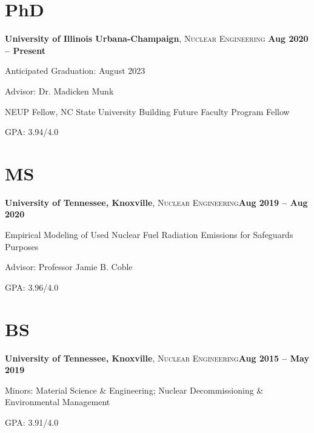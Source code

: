 \documentclass[margin,line]{resume}
\begin{document}
\begin{resume}
    \section{\mysidestyle PhD}
    \textbf{University of Illinois Urbana-Champaign}, \textsc{Nuclear Engineering}\hfill \textbf{ Aug 2020 -- Present}\vspace{-3mm}\\\vspace{-1mm}%
    \begin{list2}
        \item Anticipated Graduation: August 2023
        \item Advisor: Dr. Madicken Munk
        \item NEUP Fellow, NC State University Building Future Faculty Program Fellow
        \item GPA: 3.94/4.0
    \end{list2}
    \section{\mysidestyle MS}
    \textbf{University of Tennessee, Knoxville}, \textsc{Nuclear Engineering}\hfill\textbf{Aug 2019 -- Aug 2020}\vspace{-3mm}\\\vspace{-1mm}%
    \begin{list2}
        \item Empirical Modeling of Used Nuclear Fuel Radiation Emissions for Safeguards Purposes
        \item Advisor: Professor Jamie B. Coble
        \item GPA: 3.96/4.0
    \end{list2}
    \section{\mysidestyle BS}
    \textbf{University of Tennessee, Knoxville}, \textsc{Nuclear Engineering}\hfill\textbf{Aug 2015 -- May 2019}\vspace{-3mm}\\\vspace{-1mm}%
    \begin{list2}
        \item Minors: Material Science \& Engineering; Nuclear 
              Decommissioning \& Environmental Management
        \item GPA: 3.91/4.0
    \end{list2}
    

\end{resume}
\end{document}
